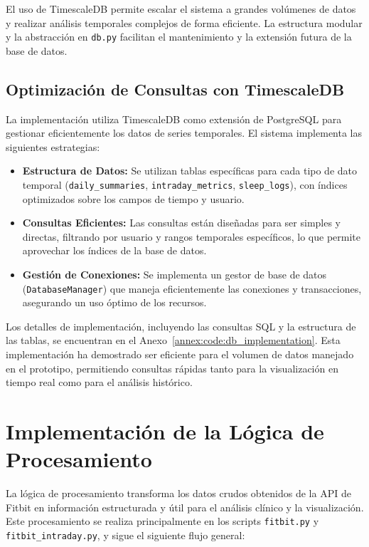 El uso de TimescaleDB permite escalar el sistema a grandes volúmenes de datos y realizar análisis temporales complejos de forma eficiente. La estructura modular y la abstracción en \texttt{db.py} facilitan el mantenimiento y la extensión futura de la base de datos.

\subsection{Optimización de Consultas con TimescaleDB}
\label{subsec:impl_timescaledb_optimization}

La implementación utiliza TimescaleDB como extensión de PostgreSQL para gestionar eficientemente los datos de series temporales. El sistema implementa las siguientes estrategias:

\begin{itemize}
    \item \textbf{Estructura de Datos:} Se utilizan tablas específicas para cada tipo de dato temporal (\texttt{daily\_summaries}, \texttt{intraday\_metrics}, \texttt{sleep\_logs}), con índices optimizados sobre los campos de tiempo y usuario.
    \item \textbf{Consultas Eficientes:} Las consultas están diseñadas para ser simples y directas, filtrando por usuario y rangos temporales específicos, lo que permite aprovechar los índices de la base de datos.
    \item \textbf{Gestión de Conexiones:} Se implementa un gestor de base de datos (\texttt{DatabaseManager}) que maneja eficientemente las conexiones y transacciones, asegurando un uso óptimo de los recursos.
\end{itemize}

Los detalles de implementación, incluyendo las consultas SQL y la estructura de las tablas, se encuentran en el Anexo~\ref{annex:code:db_implementation}. Esta implementación ha demostrado ser eficiente para el volumen de datos manejado en el prototipo, permitiendo consultas rápidas tanto para la visualización en tiempo real como para el análisis histórico.

\section{Implementación de la Lógica de Procesamiento}
\label{sec:impl_procesamiento}

La lógica de procesamiento transforma los datos crudos obtenidos de la API de Fitbit en información estructurada y útil para el análisis clínico y la visualización. Este procesamiento se realiza principalmente en los scripts \texttt{fitbit.py} y \texttt{fitbit\_intraday.py}, y sigue el siguiente flujo general:

